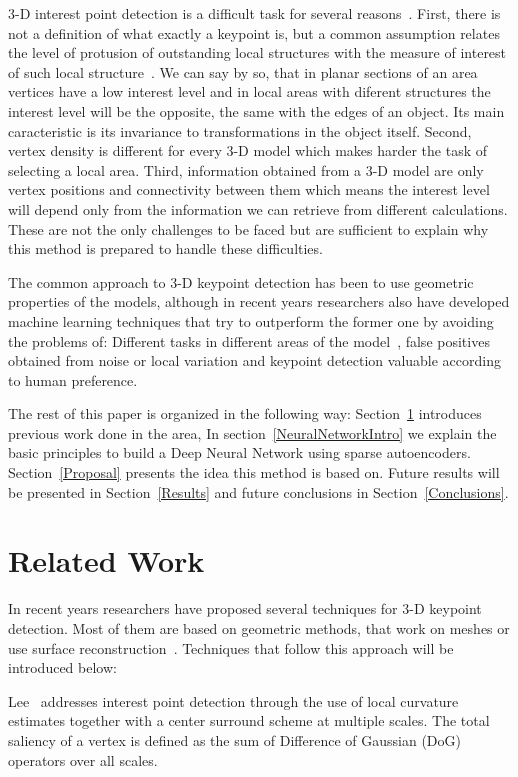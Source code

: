 \documentclass{comjnl}
\begin{document}
3-D interest point detection is a difficult task for several reasons~\cite{Discrim, Sipiran2011}.
First, there is not a definition of what exactly a keypoint is, but a common
assumption relates the level of protusion of outstanding local structures
with the measure of interest of such local structure~\cite{Sipiran2011}.
We can say by so, that in planar sections of an area
vertices have a low interest level and in local areas with diferent
structures the interest level will be the opposite, the same with
the edges of an object. Its main caracteristic is its
invariance to transformations in the object itself. Second, vertex 
density is different for every 3-D model which makes harder the task of
selecting a local area. Third, information obtained from a 3-D model
are only vertex positions and connectivity between them which means
the interest level will depend only from the information we can
retrieve from different calculations. These are not the only challenges
to be faced but are sufficient to explain why this method is prepared to
handle these difficulties. 

The common approach to 3-D keypoint detection has been to use 
geometric properties of the models, although in recent years researchers
also have developed machine learning techniques that try to outperform the
former one by avoiding the problems of: Different tasks in different areas
of the model~\cite{Lin2016}, false positives obtained from noise or local
variation and keypoint detection valuable according to human preference. 

The rest of this paper is organized in the following way:
Section~\ref{RelatedWork} introduces previous work done in the area,
In section~\ref{NeuralNetworkIntro} we explain the basic principles to
build a Deep Neural Network using sparse autoencoders.
Section~\ref{Proposal} presents the idea this method is based on. Future
results will be presented in Section~\ref{Results} and future conclusions
in Section~\ref{Conclusions}.

\section{Related Work} \label{RelatedWork}
In recent years researchers have proposed several techniques for
3-D keypoint detection. Most of them are based on geometric methods,
that work on meshes or use surface reconstruction~\cite{UnstructuredPointCloud}.
Techniques that follow this approach will be introduced below:

Lee~\cite{Lee01} addresses interest point detection through the
use of local curvature estimates together with a center
surround scheme at multiple scales. The total saliency of
a vertex is defined as the sum of Difference of Gaussian
(DoG) operators over all scales.
\end{document}
